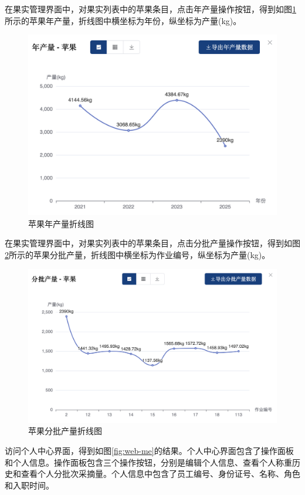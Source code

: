 在果实管理界面中，对果实列表中的苹果条目，点击年产量操作按钮，得到如图\ref{fig:chart-apple-year}所示的苹果年产量，折线图中横坐标为年份，纵坐标为产量(kg)。

\begin{figure}
    \centering
    \includegraphics[width=0.9\linewidth]{../result/chart-apple-year.png}
    \caption{苹果年产量折线图}
    \label{fig:chart-apple-year}
\end{figure}

在果实管理界面中，对果实列表中的苹果条目，点击分批产量操作按钮，得到如图\ref{fig:chart-apple-works}所示的苹果分批产量，折线图中横坐标为作业编号，纵坐标为产量(kg)。

\begin{figure}
    \centering
    \includegraphics[width=0.9\linewidth]{../result/chart-apple-works.png}
    \caption{苹果分批产量折线图}
    \label{fig:chart-apple-works}
\end{figure}

访问个人中心界面，得到如图\ref{fig:web-me}的结果。个人中心界面包含了操作面板和个人信息。操作面板包含三个操作按钮，分别是编辑个人信息、查看个人称重历史和查看个人分批次采摘量。个人信息中包含了员工编号、身份证号、名称、角色和入职时间。

